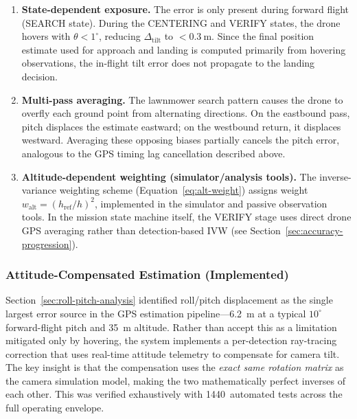 \begin{enumerate}
  \item \textbf{State-dependent exposure.}  The error is only present during forward flight (SEARCH state).  During the CENTERING and VERIFY states, the drone hovers with $\theta < 1^{\circ}$, reducing $\Delta_\mathrm{tilt}$ to $< \SI{0.3}{\metre}$.  Since the final position estimate used for approach and landing is computed primarily from hovering observations, the in-flight tilt error does not propagate to the landing decision.

  \item \textbf{Multi-pass averaging.}  The lawnmower search pattern causes the drone to overfly each ground point from alternating directions.  On the eastbound pass, pitch displaces the estimate eastward; on the westbound return, it displaces westward.  Averaging these opposing biases partially cancels the pitch error, analogous to the GPS timing lag cancellation described above.

  \item \textbf{Altitude-dependent weighting (simulator/analysis tools).}  The inverse-variance weighting scheme (Equation~\ref{eq:alt-weight}) assigns weight $w_\mathrm{alt} = (h_\mathrm{ref}/h)^2$, implemented in the simulator and passive observation tools.  In the mission state machine itself, the VERIFY stage uses direct drone GPS averaging rather than detection-based IVW (see Section~\ref{sec:accuracy-progression}).
\end{enumerate}

\subsubsection{Attitude-Compensated Estimation (Implemented)}\label{sec:tilt-compensation}

Section~\ref{sec:roll-pitch-analysis} identified roll/pitch displacement as the single largest error source in the GPS estimation pipeline---\SI{6.2}{\metre} at a typical $10^{\circ}$ forward-flight pitch and \SI{35}{\metre} altitude.  Rather than accept this as a limitation mitigated only by hovering, the system implements a per-detection ray-tracing correction that uses real-time attitude telemetry to compensate for camera tilt.  The key insight is that the compensation uses the \emph{exact same rotation matrix} as the camera simulation model, making the two mathematically perfect inverses of each other.  This was verified exhaustively with 1440~automated tests across the full operating envelope.

